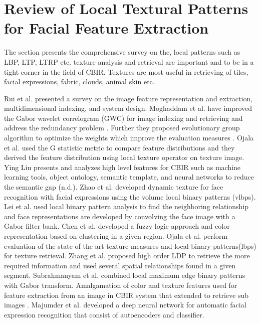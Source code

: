 \section{Review of Local Textural Patterns for Facial Feature Extraction}
The section presents the comprehensive survey on the, local patterns such as LBP, LTP, LTRP etc. texture analysis and retrieval are important and to be in a tight corner in the field of CBIR. Textures are most useful in retrieving of tiles, facial expressions, fabric, clouds, animal skin etc. 

Rui et al. \cite{rui1999image} presented a survey on the image feature representation and extraction, multidimensional indexing, and system design. 
Moghaddam et al. \cite{moghaddam2006gabor} have improved the Gabor wavelet correlogram (GWC) for image indexing and retrieving and address the redundancy problem \cite{moghaddam2006gabor}. Further they proposed evolutionary group algorithm to optimize the weights which improve the  evaluation measures  \cite{Moghaddam2007novel}.  Ojala et al. \cite{pietikainen2000rotation} used the G statistic metric to compare feature distributions and they derived the feature distribution using local texture operator on texture image. Ying Liu presents and analyzes high level features for CBIR such as machine learning tools, object ontology, semantic template, and neural networks to reduce the semantic gap (n.d.). Zhao et al. \cite{zhao2007dynamic} developed dynamic texture for face recognition with facial expressions using the volume local binary patterns (vlbps).  Lei et al. \cite{lei2010face} used local binary pattern analysis to find the neighboring relationship and face representations are developed by convolving the face image with a Gabor filter bank. Chen et al. \cite{chen2002region,chen2005clue} developed a fuzzy logic approach and color representation based on clustering in a given region. Ojala et al. \cite{ojala1996comparative} perform evaluation of the state of the art  texture measures and local binary patterns(lbps) for texture retrieval. Zhang  et al. \cite{zhang2009local} proposed high order LDP to retrieve the more required information and used several spatial relationships found in a given segment. Subrahmanyam et al. \cite{subrahmanyam2012local} combined  local maximum edge binary patterns with Gabor transform. Amalgamation of color and texture features used for feature extraction from an image in CBIR system that extended to retrieve sub images \cite{murthy2014detection}. Majumder et al. \cite{majumder2016automatic} developed a deep neural network for automatic facial expression recognition that consist of autoencoders and classifier.  	

